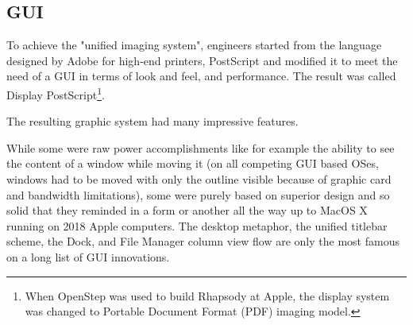 \subsection{GUI}
 To achieve the "unified imaging system", \NeXT engineers started from the language designed by Adobe for high-end printers, PostScript and modified it to meet the need of a GUI in terms of look and feel, and performance. The result was called Display PostScript\footnote{When OpenStep was used to build Rhapsody at Apple, the display system was changed to Portable Document Format (PDF) imaging model.}.\\
\par
{}
\par
The resulting graphic system had many impressive features.\\
\par
 While some were raw power accomplishments like for example the ability to see the content of a window while moving it (on all competing GUI based OSes, windows had to be moved with only the outline visible because of graphic card and bandwidth limitations), some were purely based on superior design and so solid that they reminded in a form or another all the way up to MacOS X running on 2018 Apple computers. The desktop metaphor, the unified titlebar scheme, the Dock, and File Manager column view flow are only the most famous on a long list of GUI innovations.




